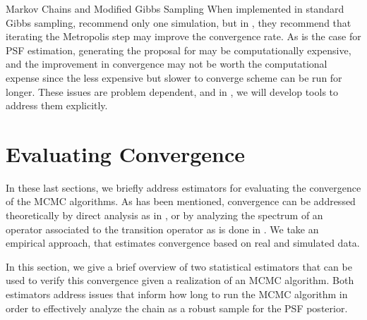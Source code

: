 \begin{chapter}{Markov Chains and Modified Gibbs Sampling}
When implemented in standard Gibbs sampling, \citep{robert2013monte} recommend only one simulation, but in \citep{van2015metropolis}, they recommend that iterating the Metropolis step may improve the convergence rate.
As is the case for PSF estimation, generating the proposal for  may be computationally expensive, and the improvement in convergence may not be worth the computational expense since the less expensive but slower to converge scheme can be run for longer.
These issues are problem dependent, and in , we will develop tools to address them explicitly.


\section{Evaluating Convergence} \label{sec:evaluatingConvergence}

In these last sections, we briefly address estimators for evaluating the convergence of the MCMC algorithms.
As has been mentioned, convergence can be addressed theoretically by direct analysis as in \citep{agapiou2014analysis}, or by analyzing the spectrum of an operator associated to the transition operator as is done in \citep{agapiou2014analysis,van2008partially}.
We take an empirical approach, that estimates convergence based on real and simulated data.

In this section, we give a brief overview of two statistical estimators that can be used to verify this convergence given a realization of an MCMC algorithm.
Both estimators address issues that inform how long to run the MCMC algorithm in order to effectively analyze the chain as a robust sample for the PSF posterior. 


\end{chapter}

